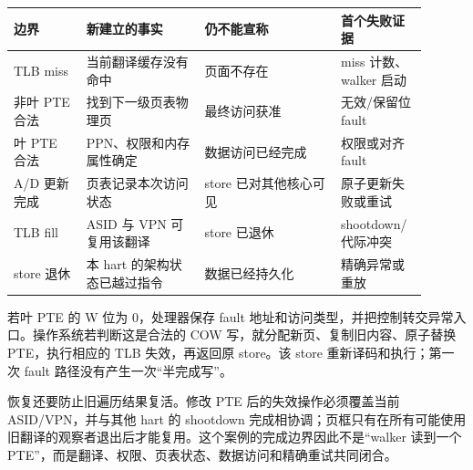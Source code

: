 \begin{longtable}{L{0.16\linewidth}L{0.26\linewidth}L{0.30\linewidth}L{0.18\linewidth}}
\toprule
边界 & 新建立的事实 & 仍不能宣称 & 首个失败证据 \\
\midrule
TLB miss & 当前翻译缓存没有命中 & 页面不存在 & miss 计数、walker 启动 \\\tablerowrule
非叶 PTE 合法 & 找到下一级页表物理页 & 最终访问获准 & 无效/保留位 fault \\\tablerowrule
叶 PTE 合法 & PPN、权限和内存属性确定 & 数据访问已经完成 & 权限或对齐 fault \\\tablerowrule
A/D 更新完成 & 页表记录本次访问状态 & store 已对其他核心可见 & 原子更新失败或重试 \\\tablerowrule
TLB fill & ASID 与 VPN 可复用该翻译 & store 已退休 & shootdown/代际冲突 \\\tablerowrule
store 退休 & 本 hart 的架构状态已越过指令 & 数据已经持久化 & 精确异常或重放 \\
\bottomrule
\end{longtable}


若叶 PTE 的 W 位为 0，处理器保存 fault 地址和访问类型，并把控制转交异常入口。操作系统若判断这是合法的 COW 写，就分配新页、复制旧内容、原子替换 PTE，执行相应的 TLB 失效，再返回原 store。该 store 重新译码和执行；第一次 fault 路径没有产生一次“半完成写”。

恢复还要防止旧遍历结果复活。修改 PTE 后的失效操作必须覆盖当前 ASID/VPN，并与其他 hart 的 shootdown 完成相协调；页框只有在所有可能使用旧翻译的观察者退出后才能复用。这个案例的完成边界因此不是“walker 读到一个 PTE”，而是翻译、权限、页表状态、数据访问和精确重试共同闭合。
